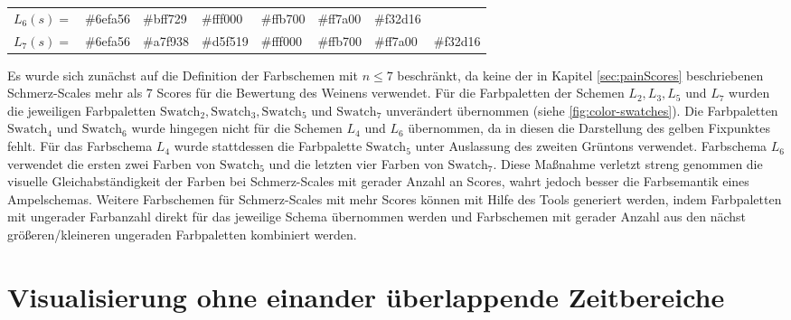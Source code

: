 \begin{table}[h]
\begin{tabular}{@{}clllllll@{}}
\multicolumn{1}{l|}{$L_6(s) = $} & \multicolumn{1}{l|}{\cellcolor[HTML]{6EFA56}\#6efa56} & \multicolumn{1}{l|}{\cellcolor[HTML]{BFF729}\#bff729} & \multicolumn{1}{l|}{\cellcolor[HTML]{FFF000}\#fff000} & \multicolumn{1}{l|}{\cellcolor[HTML]{FFB700}\#ffb700} & \multicolumn{1}{l|}{\cellcolor[HTML]{FF7A00}\#ff7a00} & \multicolumn{1}{l|}{\cellcolor[HTML]{F32D16}\#f32d16} &                                                       \\ \cmidrule(l){2-8} 
\multicolumn{1}{l|}{$L_7(s) = $} & \multicolumn{1}{l|}{\cellcolor[HTML]{6EFA56}\#6efa56} & \multicolumn{1}{l|}{\cellcolor[HTML]{A7F938}\#a7f938} & \multicolumn{1}{l|}{\cellcolor[HTML]{D5F519}\#d5f519} & \multicolumn{1}{l|}{\cellcolor[HTML]{FFF000}\#fff000} & \multicolumn{1}{l|}{\cellcolor[HTML]{FFB700}\#ffb700} & \multicolumn{1}{l|}{\cellcolor[HTML]{FF7A00}\#ff7a00} & \multicolumn{1}{l|}{\cellcolor[HTML]{F32D16}\#f32d16} \\ \bottomrule
\end{tabular}
\end{table}

Es wurde sich zunächst auf die Definition der Farbschemen mit $n \leq 7$ beschränkt, da keine der in Kapitel \ref{sec:painScores} beschriebenen Schmerz-Scales mehr als 7 Scores für die Bewertung des Weinens verwendet. Für die Farbpaletten der Schemen $L_2, L_3, L_5$ und $L_7$ wurden die jeweiligen Farbpaletten $\text{Swatch}_2, \text{Swatch}_3,\text{Swatch}_5$ und $\text{Swatch}_7$ unverändert übernommen (siehe \autoref{fig:color-swatches}). Die Farbpaletten $\text{Swatch}_4$ und $\text{Swatch}_6$ wurde hingegen nicht für die Schemen $L_4$ und $L_6$ übernommen, da in diesen die Darstellung des gelben Fixpunktes fehlt. Für das Farbschema $L_4$ wurde stattdessen die Farbpalette $\text{Swatch}_5$ unter Auslassung des zweiten Grüntons verwendet. Farbschema $L_6$ verwendet die ersten zwei Farben von $\text{Swatch}_5$ und die letzten vier Farben von $\text{Swatch}_7$. Diese Maßnahme verletzt streng genommen die visuelle Gleichabständigkeit der Farben bei Schmerz-Scales mit gerader Anzahl an Scores, wahrt jedoch besser die Farbsemantik eines Ampelschemas. Weitere Farbschemen für Schmerz-Scales mit mehr Scores können mit Hilfe des Tools generiert werden, indem Farbpaletten mit ungerader Farbanzahl direkt für das jeweilige Schema übernommen werden und Farbschemen mit gerader Anzahl aus den nächst größeren/kleineren ungeraden Farbpaletten kombiniert werden. 

\section{Visualisierung ohne einander überlappende Zeitbereiche}
\label{sec:vizNoOverlap}

